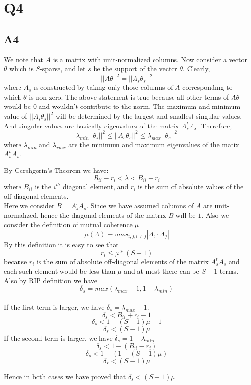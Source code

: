 \documentclass{article}
\begin{document}
\section*{Q4}
\subsection*{A4}
We note that $A$ is a matrix with unit-normalized columns. Now consider a vector $\theta$ which is $S$-sparse, and let $s$ be the support
of the vector $\theta$. Clearly,
$$||A\theta||^2 = ||A_s\theta_s||^2$$
where $A_s$ is constructed by taking only those columns of $A$ corresponding to which $\theta$ is non-zero. The above statement is true
because all other terms of $A\theta$ would be $0$ and wouldn't contribute to the norm.
The maximum and minimum value of $||A_s\theta_s||^2$ will be determined by the largest and smallest singular values. And singular values are basically eigenvalues of the matrix $A_s^tA_s$. Therefore,
$$\lambda_{min}||\theta_s||^2 \leq ||A_s\theta_s||^2 \leq \lambda_{max}||\theta_s||^2$$ 
where $\lambda_{min}$ and $\lambda_{max}$ are the minimum and maximum eigenvalues of the matix  $A_s^tA_s$.

By Gershgorin's Theorem we have:
$$B_{ii} - r_i < \lambda < B_{ii} + r_i$$ where $B_{ii}$ is the $i^{th}$ diagonal element, and $r_i$ is the sum of absolute values of the off-diagonal elements.\\
Here we consider $B = A_s^tA_s$. Since we have assumed columns of $A$ are unit-normalized, hence the diagonal elements of the matrix $B$
will be $1$. Also we consider the definition of mutual coherence $\mu$
$$\mu(A) = max_{i,j,i \neq j}|A_i \cdot A_j|$$
By this definition it is easy to see that $$r_i \leq \mu * (S-1)$$ because $r_i$ is the sum of absolute off-diagonal elements of the matrix $A_s^tA_s$ and each such element would be less than $\mu$ and at most there can be $S-1$ terms. 
Also by RIP definition we have $$\delta_s = max(\lambda_{max} -1 , 1-\lambda_{min})$$\\
If the first term is larger, we have $\delta_s = \lambda_{max} - 1$.
$$\delta_s < B_{ii} + r_i - 1$$
$$\delta_s < 1 + (S-1)\mu -1$$
$$\delta_s < (S-1)\mu$$
If the second term is larger, we have $\delta_s = 1 - \lambda_{min}$
$$\delta_s < 1 - (B_{ii} - r_i)$$
$$\delta_s < 1 - (1 - (S-1)\mu)$$
$$\delta_s < (S-1)\mu$$

Hence in both cases we have proved that $\delta_s < (S-1)\mu$
\end{document}
